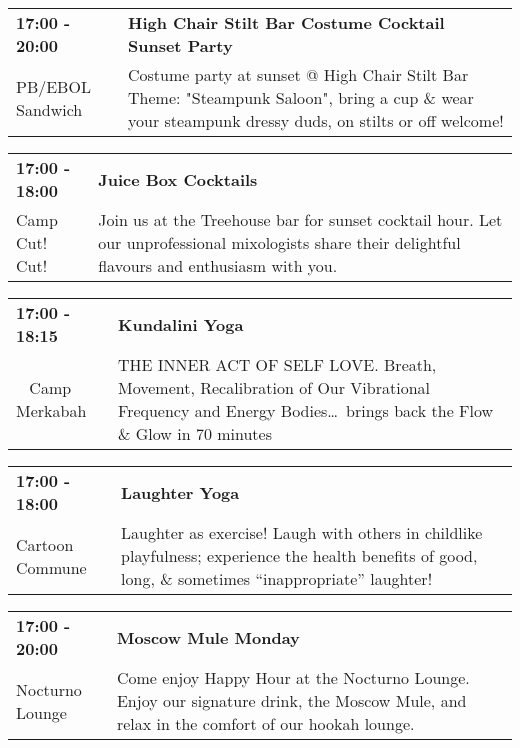 \begin{tabular}{ p{1in} p{2.2in} }
    \textbf{17:00 - 20:00} & \textbf{High Chair Stilt Bar Costume Cocktail Sunset Party} \\
    PB/EBOL Sandwich \newline  & Costume party at sunset @ High Chair Stilt Bar Theme: "Steampunk Saloon", bring a cup \& wear your steampunk dressy duds, on stilts or off welcome! \\
    \hline 
\end{tabular}
    
\begin{tabular}{ p{1in} p{2.2in} }
    \textbf{17:00 - 18:00} & \textbf{Juice Box Cocktails} \\
    Camp Cut! Cut! \newline  & Join us at the Treehouse bar for sunset cocktail hour. Let our unprofessional mixologists share their  delightful flavours and enthusiasm with you. \\
    \hline 
\end{tabular}
    
\begin{tabular}{ p{1in} p{2.2in} }
    \textbf{17:00 - 18:15} & \textbf{Kundalini Yoga} \\
    ~ \newline Camp Merkabah & THE INNER ACT OF SELF LOVE. Breath, Movement, Recalibration of Our Vibrational Frequency and Energy Bodies\ldots\ brings back the Flow \& Glow in 70 minutes \\
    \hline 
\end{tabular}
    
\begin{tabular}{ p{1in} p{2.2in} }
    \textbf{17:00 - 18:00} & \textbf{Laughter Yoga} \\
    Cartoon Commune \newline  & Laughter as exercise! Laugh with others in childlike playfulness; experience the health benefits of good, long, \& sometimes ``inappropriate'' laughter! \\
    \hline 
\end{tabular}
    
\begin{tabular}{ p{1in} p{2.2in} }
    \textbf{17:00 - 20:00} & \textbf{Moscow Mule Monday} \\
    Nocturno Lounge \newline  & Come enjoy Happy Hour at the Nocturno Lounge.  Enjoy our signature drink, the Moscow Mule, and relax in the comfort of our hookah lounge. \\
    \hline 
\end{tabular}
    
